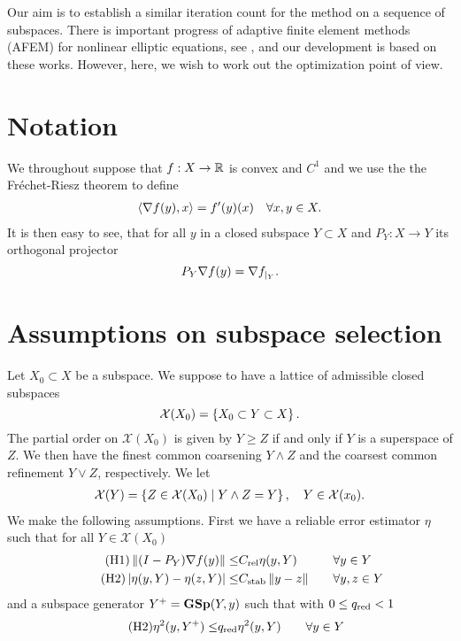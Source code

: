 \documentclass[12pt,english]{article}
\newcommand{\GS}{\mbox{\boldmath\textbf{GSp}}}
\begin{document}
Our aim is to establish a similar iteration count for the method on a sequence of subspaces.
There is important progress of adaptive finite element methods (AFEM) for nonlinear elliptic equations, 
see \cite{ErnVohralik13a,HeidWihler20,HeidPraetoriusWihler21,HaberlPraetoriusSchimanko21,GantnerHaberlPraetorius21,HeidWihler21,HeidStammWihler21,HeidWihler22}, and our development is based on these works. However, here, we wish to 
work out the optimization point of view.
%
\section{Notation}\label{sec:}
%
We throughout suppose that $f:X\to\mathbb R$ is convex and $C^1$ and we use the the Fréchet-Riesz theorem to define
%
\begin{align*}
\langle\nabla f(y),x\rangle = f'(y)(x)\quad \forall x,y\in X.
\end{align*}
%
It is then easy to see, that for all $y$ in a closed subspace $Y\subset X$ and $P_Y:X\to Y$ its orthogonal projector
%
\begin{equation}\label{eq:gradrest}
P_Y\nabla f(y) = \nabla {f}_{|_{Y}}.
\end{equation}
%

\section{Assumptions on subspace selection}\label{sec:}
%

Let $X_0\subset X$ be a subspace. We suppose to have a lattice of admissible closed subspaces 
%
\begin{equation}\label{eq:}
\mathcal X(X_0) = \left\{X_0\subset Y\subset X\right\}.
\end{equation}
%
The partial order on $\mathcal X(X_0)$ is given by $Y\ge Z$ if and only if $Y$ is a superspace of $Z$. We 
then have the finest common coarsening $Y\land Z$ and the coarsest common refinement $Y\lor Z$, respectively.
We let
%
\begin{align*}
\mathcal X(Y) = \left\{Z\in \mathcal X(X_0)\;\middle|\;Y\land Z = Y\right\},\quad Y\in \mathcal X(x_0).
\end{align*}
%
We make the following assumptions. First we have a reliable error estimator $\eta$ such that for all $Y\in \mathcal X(X_0)$
%
\begin{align}
\label{eq:hyp:estimator:reliability}\tag{H1}
\left\|(I-P_Y)\nabla f(y)\right\|\le& C_{\rm rel} \eta(y,Y)&\quad&\forall y\in Y\\
\label{hyp:estimator:stability}\tag{H2}
\left\vert{\eta(y, Y)-\eta(z, Y)}\right\vert\le& C_{\rm stab} \left\|y-z\right\|&\quad&\forall y,z\in Y
\end{align}
%
and a subspace generator $Y^+=\GS(Y, y)$ such that with $0\le q_{\rm red}<1$
%
\begin{align}
\label{hyp:estimator:reduction}\tag{H2}
%
\eta^2(y, Y^+)\le& \qred \eta^2(y,Y) &\quad&\forall y\in Y
%
\end{align}
%
\end{document}

